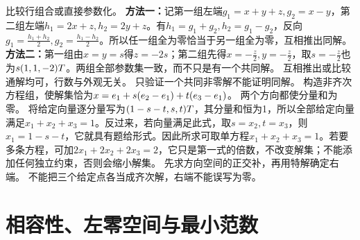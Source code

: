 {比较行组合或直接参数化。}
{\textbf{方法一：}记第一组左端$g_1=x+y+z,g_2=x-y$，第二组左端$h_1=2x+z,h_2=2y+z$。有$h_1=g_1+g_2,h_2=g_1-g_2$，反向$g_1=\frac{h_1+h_2}{2},g_2=\frac{h_1-h_2}{2}$。所以任一组全为零恰当于另一组全为零，互相推出同解。
\textbf{方法二：}第一组由$x=y=s$得$z=-2s$；第二组先得$x=-\frac{z}{2},y=-\frac{z}{2}$，取$s=-\frac{z}{2}$也为$s(1,1,-2)T$。两组全部参数集一致，而不只是有一个共同解。}
{互相推出或比较通解均可，行数与外观无关。}
{只验证一个共同非零解不能证明同解。}
{构造非齐次方程组，使解集恰为$x=e_1+s(e_2-e_1)+t(e_3-e_1)$。}
{两个方向都使分量和为零。}
{将给定向量逐分量写为$(1-s-t,s,t)T$，其分量和恒为1，所以全部给定向量满足$x_1+x_2+x_3=1$。反过来，若向量满足此式，取$s=x_2,t=x_3$，则$x_1=1-s-t$，它就具有题给形式。因此所求可取单方程$x_1+x_2+x_3=1$。若要多条方程，可加$2x_1+2x_2+2x_3=2$，它只是第一式的倍数，不改变解集；不能添加任何独立约束，否则会缩小解集。}
{先求方向空间的正交补，再用特解确定右端。}
{不能把三个给定点各当成齐次解，右端不能误写为零。}
\section{相容性、左零空间与最小范数}
